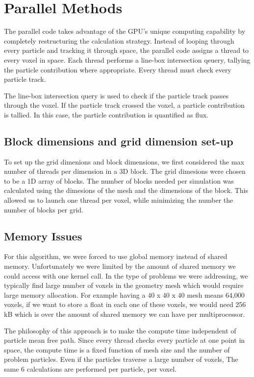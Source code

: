 \section{Parallel Methods}
The parallel code takes advantage of the GPU's unique computing capability by
completely restructuring the calculation strategy. Instead of looping through
every particle and tracking it through space, the parallel code assigns a thread
to every voxel in space. Each thread performs a line-box intersection qeuery,
tallying the particle contribution where appropriate. Every thread must check
every particle track. 

The line-box intersection query is used to check if the particle track passes 
through the voxel. If the particle track crossed the voxel, a particle contribution 
is tallied. In this case, the particle contribution is quantified as flux. 

\subsection{Block dimensions and grid dimension set-up}
To set up the grid dimenions and block dimensions, we first considered the max number of 
threads per dimension in a 3D block. 
The grid dimesions were chosen to be a 1D array of blocks. The number of blocks 
needed per simulation was calculated using the dimesions of the mesh and the 
dimensions of the block. This allowed us to launch one thread per voxel, while 
minimizing the number the number of blocks per grid. 

\subsection{Memory Issues}
For this algorithm, we were forced to use global memory instead of shared memory. 
Unfortunately we were limited by the amount of shared memory we 
could access with one kernel call. In the type of problems we were addressing, 
we typically find large number of voxels in the geometry mesh which would require 
large memory allocation. For example having a 40 x 40 x 40 mesh means 64,000 
voxels, if we want to store a float in each one of these voxels, we would need 
256 kB which is over the amount of shared memory we can have per multiprocessor.   


The philosophy of this approach is to make the compute time independent of
particle mean free path. Since every thread checks every particle at one point
in space, the compute time is a fixed function of mesh size and the number of
problem particles. Even if the particles traverse a large number of voxels, The
same 6 calculations are performed per particle, per voxel.

